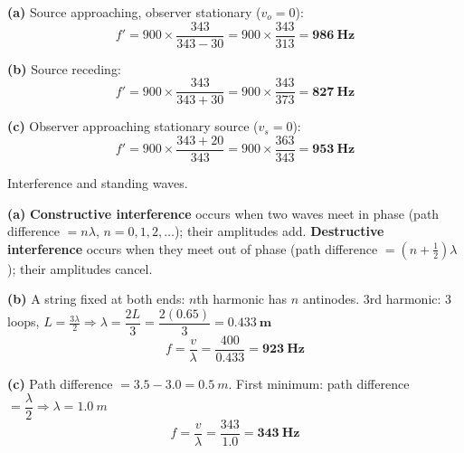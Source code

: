 \documentclass[addpoints]{exam}
\begin{document}
\begin{questions}
\begin{solution}[9cm]
\textbf{(a)} Source approaching, observer stationary ($v_o = 0$):
\[
f' = 900 \times \frac{343}{343 - 30} = 900 \times \frac{343}{313} = \mathbf{\SI{986}{Hz}}
\]

\textbf{(b)} Source receding:
\[
f' = 900 \times \frac{343}{343 + 30} = 900 \times \frac{343}{373} = \mathbf{\SI{827}{Hz}}
\]

\textbf{(c)} Observer approaching stationary source ($v_s = 0$):
\[
f' = 900 \times \frac{343 + 20}{343} = 900 \times \frac{363}{343} = \mathbf{\SI{953}{Hz}}
\]
\end{solution}

\question Interference and standing waves.
\begin{solution}[9cm]
\textbf{(a)} \textbf{Constructive interference} occurs when two waves meet in phase
(path difference $= n\lambda$, $n = 0,1,2,\ldots$); their amplitudes add. \textbf{Destructive
interference} occurs when they meet out of phase (path difference $= (n+\tfrac{1}{2})\lambda$);
their amplitudes cancel.

\textbf{(b)} A string fixed at both ends: $n$th harmonic has $n$ antinodes.
3rd harmonic: 3 loops, $L = \tfrac{3\lambda}{2} \Rightarrow \lambda = \dfrac{2L}{3}
= \dfrac{2(0.65)}{3} = \mathbf{\SI{0.433}{m}}$
\[
f = \frac{v}{\lambda} = \frac{400}{0.433} = \mathbf{\SI{923}{Hz}}
\]

\textbf{(c)} Path difference $= 3.5 - 3.0 = \SI{0.5}{m}$.
First minimum: path difference $= \dfrac{\lambda}{2} \Rightarrow \lambda = \SI{1.0}{m}$
\[
f = \frac{v}{\lambda} = \frac{343}{1.0} = \mathbf{\SI{343}{Hz}}
\]
\end{solution}

\end{questions}
\end{document}
